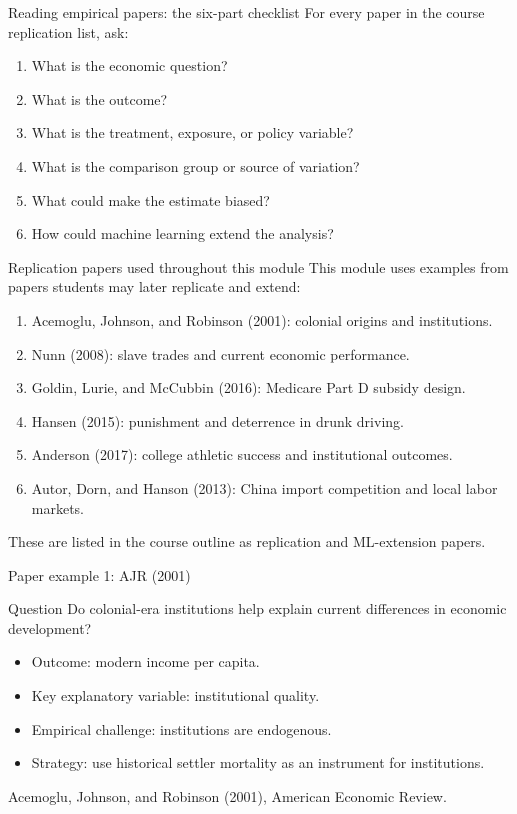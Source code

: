 \documentclass[aspectratio=169,11pt]{beamer}
\newcommand{\smallcite}[1]{{\scriptsize \textcolor{WLUGray}{#1}}}
\begin{document}
\begin{frame}{Reading empirical papers: the six-part checklist}
For every paper in the course replication list, ask:
\begin{enumerate}
  \item What is the economic question?
  \item What is the outcome?
  \item What is the treatment, exposure, or policy variable?
  \item What is the comparison group or source of variation?
  \item What could make the estimate biased?
  \item How could machine learning extend the analysis?
\end{enumerate}
\end{frame}

\begin{frame}{Replication papers used throughout this module}
This module uses examples from papers students may later replicate and extend:
\begin{enumerate}
  \item Acemoglu, Johnson, and Robinson (2001): colonial origins and institutions.
  \item Nunn (2008): slave trades and current economic performance.
  \item Goldin, Lurie, and McCubbin (2016): Medicare Part D subsidy design.
  \item Hansen (2015): punishment and deterrence in drunk driving.
  \item Anderson (2017): college athletic success and institutional outcomes.
  \item Autor, Dorn, and Hanson (2013): China import competition and local labor markets.
\end{enumerate}
\smallcite{These are listed in the course outline as replication and ML-extension papers.}
\end{frame}

\begin{frame}{Paper example 1: AJR (2001)}
\begin{block}{Question}
Do colonial-era institutions help explain current differences in economic development?
\end{block}
\begin{itemize}
  \item Outcome: modern income per capita.
  \item Key explanatory variable: institutional quality.
  \item Empirical challenge: institutions are endogenous.
  \item Strategy: use historical settler mortality as an instrument for institutions.
\end{itemize}
\smallcite{Acemoglu, Johnson, and Robinson (2001), American Economic Review.}
\end{frame}
\end{document}
